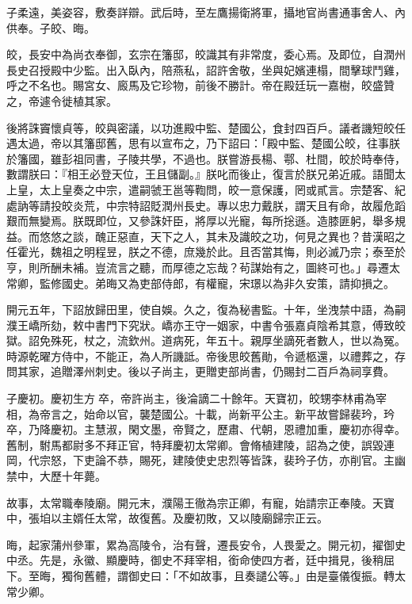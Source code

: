 \begin{pinyinscope}
 子柔遠，美姿容，敷奏詳辯。武后時，至左鷹揚衛將軍，攝地官尚書通事舍人、內供奉。子皎、晦。



 皎，長安中為尚衣奉御，玄宗在籓邸，皎識其有非常度，委心焉。及即位，自潤州長史召授殿中少監。出入臥內，陪燕私，詔許舍敬，坐與妃嬪連榻，間擊球鬥雞，呼之不名也。賜宮女、廄馬及它珍物，前後不勝計。帝在殿廷玩一嘉樹，皎盛贊之，帝遽令徙植其家。



 後將誅竇懷貞等，皎與密議，以功進殿中監、楚國公，食封四百戶。議者譏短皎任遇太過，帝以其籓邸舊，思有以宣布之，乃下詔曰：「殿中監、楚國公皎，往事朕於籓國，雖彭祖同書，子陵共學，不過也。朕嘗游長楊、鄠、杜間，皎於時奉侍，數謂朕曰：『相王必登天位，王且儲副。』朕叱而後止，復言於朕兄弟近戚。語聞太上皇，太上皇奏之中宗，遣嗣虢王邕等鞫問，皎一意保護，罔或貳言。宗楚客、紀處訥等請投皎炎荒，中宗特詔貶潤州長史。專以忠力戴朕，謂天且有命，故履危蹈艱而無變焉。朕既即位，又參誅奸臣，將厚以光寵，每所捴遜。造膝匪躬，舉多規益。而悠悠之談，醜正惡直，天下之人，其未及識皎之功，何見之異也？昔漢昭之任霍光，魏祖之明程昱，朕之不德，庶幾於此。且否當其悔，則必滅乃宗；泰至於亨，則所酬未補。豈流言之聽，而厚德之忘哉？茍謀始有之，圖終可也。」尋遷太常卿，監修國史。弟晦又為吏部侍郎，有權寵，宋璟以為非久安策，請抑損之。



 開元五年，下詔放歸田里，使自娛。久之，復為秘書監。十年，坐洩禁中語，為嗣濮王嶠所劾，敕中書門下究狀。嶠亦王守一姻家，中書令張嘉貞陰希其意，傅致皎獄。詔免殊死，杖之，流欽州。道病死，年五十。親厚坐謫死者數人，世以為冤。時源乾曜方侍中，不能正，為人所譏詆。帝後思皎舊勛，令遞柩還，以禮葬之，存問其家，追贈澤州刺史。後以子尚主，更贈吏部尚書，仍賜封二百戶為祠享費。



 子慶初。慶初生方卒，帝許尚主，後淪謫二十餘年。天寶初，皎甥李林甫為宰相，為帝言之，始命以官，襲楚國公。十載，尚新平公主。新平故嘗歸裴玪，玪卒，乃降慶初。主慧淑，閑文墨，帝賢之，歷肅、代朝，恩禮加重，慶初亦得幸。舊制，駙馬都尉多不拜正官，特拜慶初太常卿。會脩植建陵，詔為之使，誤毀連岡，代宗怒，下吏論不恭，賜死，建陵使史忠烈等皆誅，裴玪子仿，亦削官。主幽禁中，大歷十年薨。



 故事，太常職奉陵廟。開元末，濮陽王徹為宗正卿，有寵，始請宗正奉陵。天寶中，張垍以主婿任太常，故復舊。及慶初敗，又以陵廟歸宗正云。



 晦，起家蒲州參軍，累為高陵令，治有聲，遷長安令，人畏愛之。開元初，擢御史中丞。先是，永徽、顯慶時，御史不拜宰相，銜命使四方者，廷中揖見，後稍屈下。至晦，獨徇舊體，謂御史曰：「不如故事，且奏譴公等。」由是臺儀復振。轉太常少卿。




\end{pinyinscope}
